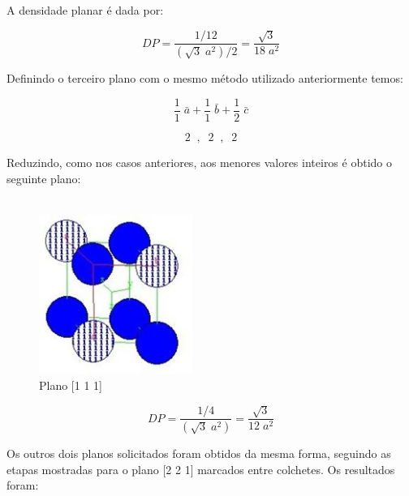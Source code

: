 \documentclass[10pt,twocolumn,letterpaper]{article}
\begin{document}
\hspace{1cm} A densidade planar é dada por:

\begin{equation*}
    DP = \frac{1/12}{(\sqrt{3}\;a^2)/2} = \frac{\sqrt{3}}{18\;a^2}
\end{equation*}

\hspace{1cm} Definindo o terceiro plano com o mesmo método utilizado anteriormente temos:

\begin{equation*}
    \frac{1}{1}\;\bar{a} + \frac{1}{1}\;\bar{b} + \frac{1}{2}\;\bar{c}
\end{equation*}

\begin{equation*}
    2 \;\; , \;\; 2 \;\; , \;\; 2
\end{equation*}

\hspace{1cm} Reduzindo, como nos casos anteriores, aos menores valores inteiros é obtido o seguinte plano:

\vspace{-0.5cm}

\begin{align*}
    [ \; 1 \; 1 \; 1 \;]
\end{align*}

\vspace{-0.5cm}

\begin{figure}[h]
    \centering
    \includegraphics[width=5cm]{fig7.jpg}
    \caption{Plano [1 1 1]}
    \label{fig:label}
\end{figure}

\vspace{-0.25cm}

\begin{equation*}
    DP = \frac{1/4}{(\sqrt{3}\;a^2)} = \frac{\sqrt{3}}{12 \; a^2}
\end{equation*}

\hspace{1cm} Os outros dois planos solicitados foram obtidos da mesma forma, seguindo as etapas mostradas para o plano [2 2 1] marcados entre colchetes. Os resultados foram:
\end{document}
